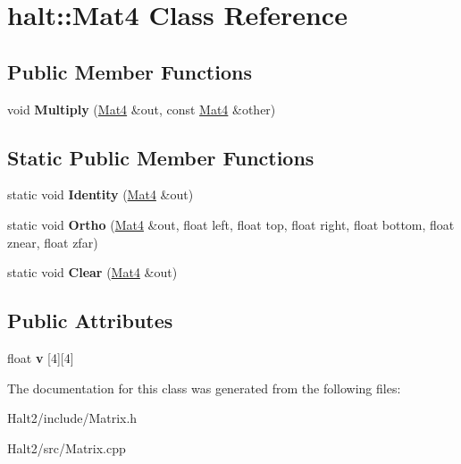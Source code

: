 \hypertarget{classhalt_1_1_mat4}{\section{halt\-:\-:\-Mat4 \-Class \-Reference}
\label{classhalt_1_1_mat4}
}
\subsection*{\-Public \-Member \-Functions}
\begin{DoxyCompactItemize}
\item 
\hypertarget{classhalt_1_1_mat4_aa2df89b8b287fdfed2bf6de23ab6aa12}{void {\bfseries \-Multiply} (\hyperlink{classhalt_1_1_mat4}{\-Mat4} \&out, const \hyperlink{classhalt_1_1_mat4}{\-Mat4} \&other)}\label{classhalt_1_1_mat4_aa2df89b8b287fdfed2bf6de23ab6aa12}

\end{DoxyCompactItemize}
\subsection*{\-Static \-Public \-Member \-Functions}
\begin{DoxyCompactItemize}
\item 
\hypertarget{classhalt_1_1_mat4_ac2b26f05ea440da0b0333352601ead3f}{static void {\bfseries \-Identity} (\hyperlink{classhalt_1_1_mat4}{\-Mat4} \&out)}\label{classhalt_1_1_mat4_ac2b26f05ea440da0b0333352601ead3f}

\item 
\hypertarget{classhalt_1_1_mat4_a9d1ec82c8bb0fa07dc7d42aae9fd200b}{static void {\bfseries \-Ortho} (\hyperlink{classhalt_1_1_mat4}{\-Mat4} \&out, float left, float top, float right, float bottom, float znear, float zfar)}\label{classhalt_1_1_mat4_a9d1ec82c8bb0fa07dc7d42aae9fd200b}

\item 
\hypertarget{classhalt_1_1_mat4_a05a33296b08e9ef55b74db2253563160}{static void {\bfseries \-Clear} (\hyperlink{classhalt_1_1_mat4}{\-Mat4} \&out)}\label{classhalt_1_1_mat4_a05a33296b08e9ef55b74db2253563160}

\end{DoxyCompactItemize}
\subsection*{\-Public \-Attributes}
\begin{DoxyCompactItemize}
\item 
\hypertarget{classhalt_1_1_mat4_a7598c936ad3d548268063893edc305ad}{float {\bfseries v} \mbox{[}4\mbox{]}\mbox{[}4\mbox{]}}\label{classhalt_1_1_mat4_a7598c936ad3d548268063893edc305ad}

\end{DoxyCompactItemize}


\-The documentation for this class was generated from the following files\-:\begin{DoxyCompactItemize}
\item 
\-Halt2/include/\-Matrix.\-h\item 
\-Halt2/src/\-Matrix.\-cpp\end{DoxyCompactItemize}
